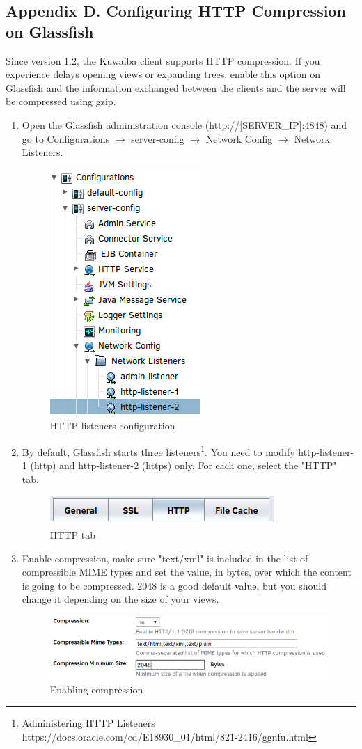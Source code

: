 \documentclass[a4paper]{article}
\begin{document}
\begin{appendices}
			\section{Appendix D. Configuring HTTP Compression on Glassfish} \label{app:AppendixD}
				Since version 1.2, the Kuwaiba client supports HTTP compression. If you experience delays opening views or expanding trees, enable this option on Glassfish and the information exchanged between the clients and the server will be compressed using gzip.
				\begin{enumerate}
					\item Open the Glassfish administration console (http://[SERVER\_IP]:4848) and go to Configurations $\rightarrow$ server-config $\rightarrow$ Network Config $\rightarrow$ Network Listeners.\\
					\begin{figure}[h!]
						\centering
						\includegraphics[width=0.2\linewidth]{img/gf_configurations_server_config.png} 	
						\caption{HTTP listeners configuration}
						\label{fig:listeners-config}
					\end{figure}
					\item By default, Glassfish starts three listeners\footnote{Administering HTTP Listeners https://docs.oracle.com/cd/E18930\_01/html/821-2416/ggnfu.html}. You need to modify http-listener-1 (http) and http-listener-2 (https) only. For each one, select the "HTTP" tab.
					\begin{figure}[h!]
						\centering
						\includegraphics[width=0.4\linewidth]{img/gf_edit_http_listener.png} 	
						\caption{HTTP tab}
						\label{fig:http-tab}
					\end{figure}
					\item Enable compression, make sure "text/xml" is included in the list of compressible MIME types and set the value, in bytes, over which the content is going to be compressed. 2048 is a good default value, but you should change it depending on the size of your views.
					\begin{figure}[h!]
						\centering
						\includegraphics[width=0.7\linewidth]{img/gf_enable_compression.png} 	
						\caption{Enabling compression}
						\label{fig:enabling-compression}
					\end{figure}
				\end{enumerate}
			\newpage

\end{appendices}
\end{document}
